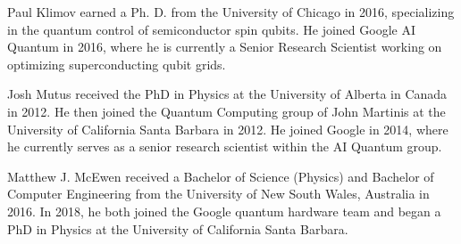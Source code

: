 \documentclass[journal]{IEEEtran}
\begin{document}
\begin{IEEEbiography}{Paul Klimov} earned a Ph. D. from the University of Chicago in 2016, specializing in the quantum control of semiconductor spin qubits.  He joined Google AI Quantum in 2016, where he is currently a Senior Research Scientist working on optimizing superconducting qubit grids. 


\end{IEEEbiography}
\begin{IEEEbiography}{Josh Mutus} received the PhD in Physics at the University of Alberta in Canada in 2012. He then joined the Quantum Computing group of John Martinis at the University of California Santa Barbara in 2012. He joined Google in 2014, where he currently serves as a senior research scientist within the AI Quantum group.


\end{IEEEbiography}
\begin{IEEEbiography}{Matthew J. McEwen} received a Bachelor of Science (Physics) and Bachelor of Computer Engineering from the University of New South Wales, Australia in 2016. In 2018, he both joined the Google quantum hardware team and began a PhD in Physics at the University of California Santa Barbara.



\end{IEEEbiography}
\end{document}
